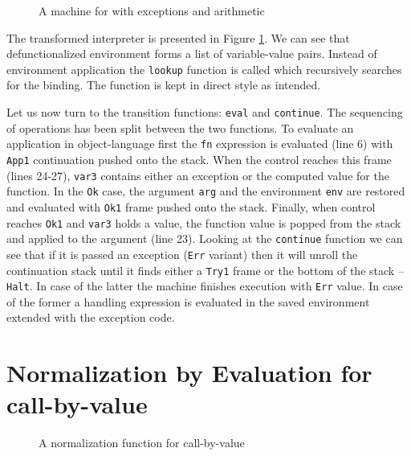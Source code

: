 \begin{figure}
  
  \caption{A machine for \LC{} with exceptions and arithmetic}
  \label{fig:studies-exceptions-machine}
\end{figure}

The transformed interpreter is presented in Figure \ref{fig:studies-exceptions-machine}.
We can see that defunctionalized environment forms a list of variable-value pairs.
Instead of environment application the \lstinline!lookup! function is called which recursively searches for the binding.
The function is kept in direct style as intended.

Let us now turn to the transition functions: \lstinline!eval! and \lstinline!continue!.
The sequencing of operations has been split between the two functions.
To evaluate an application in object-language first the \lstinline!fn! expression is evaluated (line 6) with \lstinline!App1! continuation pushed onto the stack.
When the control reaches this frame (lines 24-27), \lstinline!var3! contains either an exception or the computed value for the function.
In the \lstinline!Ok! case, the argument \lstinline!arg! and the environment \lstinline!env! are restored and evaluated with \lstinline!Ok1! frame pushed onto the stack.
Finally, when control reaches \lstinline!Ok1! and \lstinline!var3! holds a value, the function value is popped from the stack and applied to the argument (line 23).
Looking at the \lstinline!continue! function we can see that if it is passed an exception (\lstinline!Err! variant) then it will unroll the continuation stack until it finds either a \lstinline!Try1! frame or the bottom of the stack -- \lstinline!Halt!.
In case of the latter the machine finishes execution with \lstinline!Err! value.
In case of the former a handling expression is evaluated in the saved environment extended with the exception code. 

\section{Normalization by Evaluation for call-by-value \LC{}}

\begin{figure}
  
  \caption{A normalization function for call-by-value \LC{}}
  \label{fig:studies-nbe}
\end{figure}


